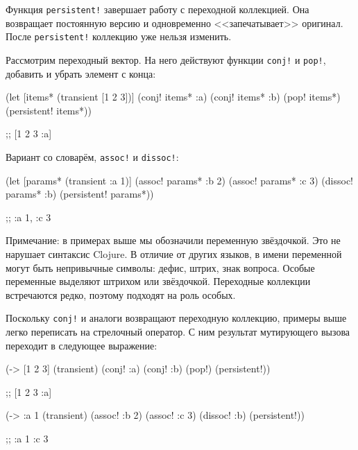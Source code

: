Функция \verb|persistent!| завершает работу с переходной коллекцией. Она
возвращает постоянную версию и одновременно <<запечатывает>> оригинал. После
\verb|persistent!| коллекцию уже нельзя изменить.

Рассмотрим переходный вектор. На него действуют функции \verb|conj!| и
\verb|pop!|, добавить и убрать элемент с конца:


\begin{english}
  \begin{clojure}
(let [items* (transient [1 2 3])]
  (conj! items* :a)
  (conj! items* :b)
  (pop! items*)
  (persistent! items*))

;; [1 2 3 :a]
  \end{clojure}
\end{english}


\noindent
Вариант со словарём, \verb|assoc!| и \verb|dissoc!|:

\begin{english}
  \begin{clojure}
(let [params* (transient {:a 1})]
  (assoc! params* :b 2)
  (assoc! params* :c 3)
  (dissoc! params* :b)
  (persistent! params*))

;; {:a 1, :c 3}
  \end{clojure}
\end{english}

Примечание: в примерах выше мы обозначили переменную звёздочкой. Это не нарушает
синтаксис Clojure. В отличие от других языков, в имени переменной могут быть
непривычные символы: дефис, штрих, знак вопроса. Особые переменные выделяют
штрихом или звёздочкой. Переходные коллекции встречаются редко, поэтому подходят
на роль особых.

Поскольку \verb|conj!| и аналоги возвращают переходную коллекцию, примеры выше
легко переписать на стрелочный оператор. С ним результат мутирующего вызова
переходит в следующее выражение:

\label{thread-transient}

\ifnarrow

\begin{english}

  \begin{clojure}
(-> [1 2 3]
    (transient)
    (conj! :a)
    (conj! :b)
    (pop!)
    (persistent!))

;; [1 2 3 :a]
  \end{clojure}

\splitter

  \begin{clojure}
(-> {:a 1}
    (transient)
    (assoc! :b 2)
    (assoc! :c 3)
    (dissoc! :b)
    (persistent!))

;; {:a 1 :c 3}
  \end{clojure}

\end{english}

